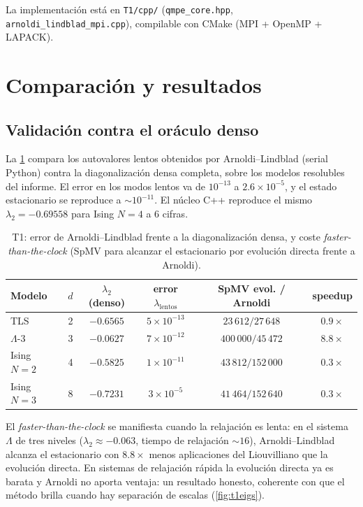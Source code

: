 La implementación está en \texttt{T1/cpp/} (\texttt{qmpe\_core.hpp},
\texttt{arnoldi\_lindblad\_mpi.cpp}), compilable con CMake (MPI + OpenMP + LAPACK).

\section{Comparación y resultados}

\subsection{Validación contra el oráculo denso}

La \cref{tab:t1val} compara los autovalores lentos obtenidos por Arnoldi--Lindblad
(serial Python) contra la diagonalización densa completa, sobre los modelos
resolubles del informe. El error en los modos lentos va de $10^{-13}$ a
$2.6\times10^{-5}$, y el estado estacionario se reproduce a $\sim 10^{-11}$. El
núcleo C++ reproduce el mismo $\lambda_2=-0.69558$ para Ising $N=4$ a 6 cifras.

\begin{table}[t]
\centering
\caption{T1: error de Arnoldi--Lindblad frente a la diagonalización densa, y
coste \emph{faster-than-the-clock} (SpMV para alcanzar el estacionario por
evolución directa frente a Arnoldi).}
\label{tab:t1val}
\begin{tabular}{lccccc}
\toprule
Modelo & $d$ & $\lambda_2$ (denso) & error $\lambda_{\text{lentos}}$ & SpMV evol. / Arnoldi & speedup \\
\midrule
TLS        & 2 & $-0.6565$ & $5\times10^{-13}$ & $23\,612 / 27\,648$ & $0.9\times$ \\
$\Lambda$-3 & 3 & $-0.0627$ & $7\times10^{-12}$ & $400\,000 / 45\,472$ & $\mathbf{8.8\times}$ \\
Ising $N{=}2$ & 4 & $-0.5825$ & $1\times10^{-11}$ & $43\,812 / 152\,000$ & $0.3\times$ \\
Ising $N{=}3$ & 8 & $-0.7231$ & $3\times10^{-5}$ & $41\,464 / 152\,640$ & $0.3\times$ \\
\bottomrule
\end{tabular}
\end{table}

El \emph{faster-than-the-clock} se manifiesta cuando la relajación es lenta: en el
sistema $\Lambda$ de tres niveles ($\lambda_2\approx-0.063$, tiempo de relajación
$\sim 16$), Arnoldi--Lindblad alcanza el estacionario con $8.8\times$ menos
aplicaciones del Liouvilliano que la evolución directa. En sistemas de relajación
rápida la evolución directa ya es barata y Arnoldi no aporta ventaja: un resultado
honesto, coherente con que el método brilla cuando hay separación de escalas
(\cref{fig:t1eigs}).

